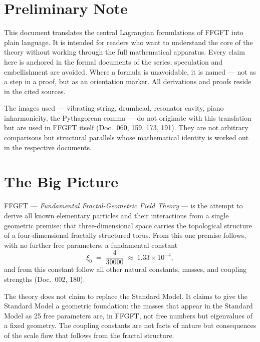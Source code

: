 
\section*{Preliminary Note}

This document translates the central Lagrangian formulations of FFGFT
into plain language. It is intended for readers who want to understand
the core of the theory without working through the full mathematical
apparatus. Every claim here is anchored in the formal documents of
the series; speculation and embellishment are avoided. Where a
formula is unavoidable, it is named --- not as a step in a proof,
but as an orientation marker. All derivations and proofs reside in
the cited sources.

The images used --- vibrating string, drumhead, resonator cavity,
piano inharmonicity, the Pythagorean comma --- do not originate with
this translation but are used in FFGFT itself (Doc.~060, 159, 173,
191). They are not arbitrary comparisons but structural parallels
whose mathematical identity is worked out in the respective
documents.

\section{The Big Picture}

FFGFT --- \emph{Fundamental Fractal-Geometric Field Theory} --- is
the attempt to derive all known elementary particles and their
interactions from a single geometric premise: that three-dimensional
space carries the topological structure of a four-dimensional
fractally structured torus. From this one premise follows, with no
further free parameters, a fundamental constant
\[
  \xi_0 \;=\; \frac{4}{30000} \;\approx\; 1{.}33 \times 10^{-4},
\]
and from this constant follow all other natural constants, masses,
and coupling strengths (Doc.~002, 180).

The theory does not claim to replace the Standard Model. It claims
to give the Standard Model a geometric foundation: the masses that
appear in the Standard Model as 25 free parameters are, in FFGFT,
not free numbers but eigenvalues of a fixed geometry. The coupling
constants are not facts of nature but consequences of the scale flow
that follows from the fractal structure.

